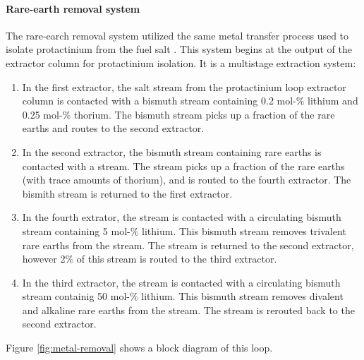\paragraph{Rare-earth removal system}
The rare-earch removal system utilized the same metal transfer process used to
isolate protactinium from the fuel salt \cite{robertson_conceptual_1971}. This
system begins at the output of the extractor column for protactinium isolation.
It is a multistage extraction system:
\begin{enumerate}
    \item In the first extractor, the salt stream from the protactinium loop
    extractor column is contacted with a bismuth stream containing 0.2 mol-\%
    lithium and 0.25 mol-\% thorium. The bismuth stream picks up a fraction of
    the rare earths and routes to the second extractor.
    \item In the second extractor, the bismuth stream containing rare earths is
    contacted with a  stream.  The  stream picks up a fraction
    of the rare earths (with trace amounts of thorium), and is routed to the
    fourth extractor. The bismith stream is returned to the first extractor.
    \item In the fourth extrator, the  stream is contacted with a
    circulating bismuth stream containing 5 mol-\% lithium. This bismuth stream
    removes trivalent rare earths from the  stream. The 
    stream is returned to the second extractor, however 2\% of this 
    stream is routed to the third extractor.
    \item In the third extractor, the  stream is contacted with a
    circulating bismuth stream containig 50 mol-\% lithium. This bismuth stream
    removes divalent and alkaline rare earths from the  stream. The
     stream is rerouted back to the second extractor.
\end{enumerate}

Figure \ref{fig:metal-removal} shows a block diagram of this loop. 

